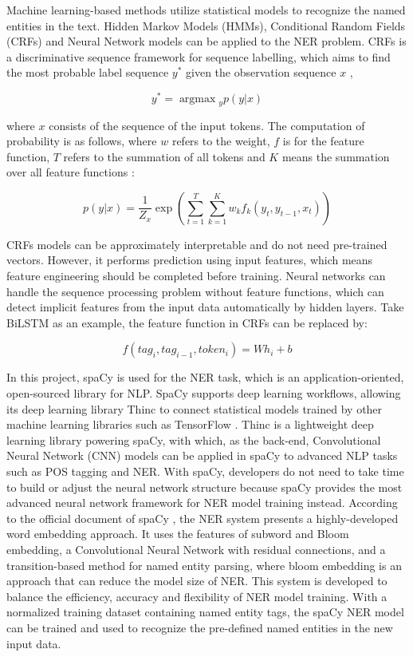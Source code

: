 Machine learning-based methods utilize statistical models to recognize the named entities in the text. Hidden Markov Models (HMMs), Conditional Random Fields (CRFs) and Neural Network models can be applied to the NER problem. CRFs is a discriminative sequence framework for sequence labelling, which aims to find the most probable label sequence $y^*$ given the observation sequence $x$ \cite{lafferty2001conditional}, 

\begin{equation}
    y^* = \mathop{\arg\max}{_yp(y|x)}
\end{equation}

where $x$ consists of the sequence of the input tokens. The computation of probability is as follows, where $w$ refers to the weight, $f$ is for the feature function, $T$ refers to the summation of all tokens and $K$ means the summation over all feature functions \cite{lafferty2001conditional}:

\begin{equation}
    p(y|x) = \frac{1}{Z_x}\exp(\sum_{t=1}^{T}\sum_{k=1}^{K}w_kf_k(y_t,y_{t-1},x_t))
\end{equation}

CRFs models can be approximately interpretable and do not need pre-trained vectors. However, it performs prediction using input features, which means feature engineering should be completed before training. Neural networks can handle the sequence processing problem without feature functions, which can detect implicit features from the input data automatically by hidden layers. Take BiLSTM as an example, the feature function in CRFs can be replaced by:

\begin{equation}
    f(tag_i, tag_{i-1}, token_i) = Wh_i + b
\end{equation}

In this project, spaCy is used for the NER task, which is an application-oriented, open-sourced library for NLP. SpaCy supports deep learning workflows, allowing its deep learning library Thinc to connect statistical models trained by other machine learning libraries such as TensorFlow \cite{enwiki:1094217869}. Thinc is a lightweight deep learning library powering spaCy, with which, as the back-end, Convolutional Neural Network (CNN) models can be applied in spaCy to advanced NLP tasks such as POS tagging and NER. With spaCy, developers do not need to take time to build or adjust the neural network structure because spaCy provides the most advanced neural network framework for NER model training instead. According to the official document of spaCy \cite{honnibal_2022}, the NER system presents a highly-developed word embedding approach. It uses the features of subword and Bloom embedding, a Convolutional Neural Network with residual connections, and a transition-based method for named entity parsing, where bloom embedding is an approach that can reduce the model size of NER. This system is developed to balance the efficiency, accuracy and flexibility of NER model training. With a normalized training dataset containing named entity tags, the spaCy NER model can be trained and used to recognize the pre-defined named entities in the new input data.

